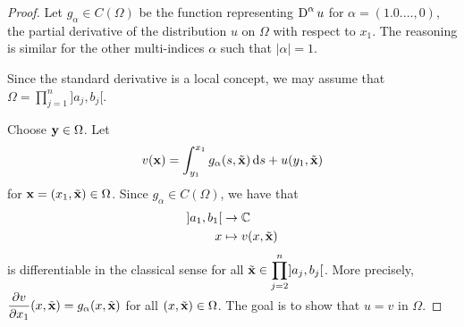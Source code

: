 \begin{proof}
Let $g_\alpha \in C(\Omega)$ be the function representing
$\displaystyle \operatorname{D}^\alpha u$ for $\alpha = (1.0.\ldots,0)$, the
partial derivative of the distribution $u$ on $\Omega$ with respect to
$x_1$.  The reasoning is similar for the other multi-indices $\alpha$
such that $|\alpha|=1$.

Since the standard derivative is a local concept, we may assume that
$\displaystyle \Omega = \prod_{j=1}^n ]a_j,b_j[$.

Choose $\mathbf{y} \in \Omega$. Let
\[
v(\mathbf{x}) = \int_{y_1}^{x_1} g_\alpha(s,\tilde{\mathbf{x}}) \,\mathrm{d}{s} +
u(y_1,\tilde{\mathbf{x}})
\]
for $\mathbf{x} = (x_1, \tilde{\mathbf{x}}) \in \Omega$.
Since $g_\alpha \in C(\Omega)$, we have that
\begin{align*}
]a_1,b_1[ & \rightarrow \mathbb{C} \\
x & \mapsto v(x,\tilde{\mathbf{x}})
\end{align*}
is differentiable in the classical sense for all
$\displaystyle \tilde{\mathbf{x}} \in \prod_{j=2}^n ]a_j,b_j[$.
More precisely, $\displaystyle \frac{\partial{v}}{\partial x_1}(x,\tilde{\mathbf{x}}) =
g_\alpha(x,\tilde{\mathbf{x}})$ for all $(x, \tilde{\mathbf{x}}) \in \Omega$.
The goal is to show that $u=v$ in $\Omega$.


\end{proof}
